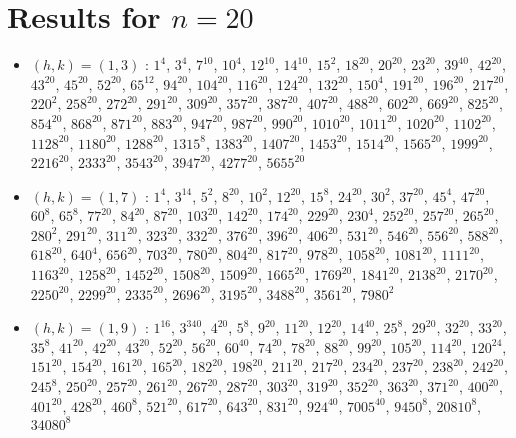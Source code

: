 \section{Results for $n=20$}
\begin{itemize}
\item $(h,k)=(1,3)$ : $1^{4}$, $3^{4}$, $7^{10}$, $10^{4}$, $12^{10}$, $14^{10}$, $15^{2}$, $18^{20}$, $20^{20}$, $23^{20}$, $39^{40}$, $42^{20}$, $43^{20}$, $45^{20}$, $52^{20}$, $65^{12}$, $94^{20}$, $104^{20}$, $116^{20}$, $124^{20}$, $132^{20}$, $150^{4}$, $191^{20}$, $196^{20}$, $217^{20}$, $220^{2}$, $258^{20}$, $272^{20}$, $291^{20}$, $309^{20}$, $357^{20}$, $387^{20}$, $407^{20}$, $488^{20}$, $602^{20}$, $669^{20}$, $825^{20}$, $854^{20}$, $868^{20}$, $871^{20}$, $883^{20}$, $947^{20}$, $987^{20}$, $990^{20}$, $1010^{20}$, $1011^{20}$, $1020^{20}$, $1102^{20}$, $1128^{20}$, $1180^{20}$, $1288^{20}$, $1315^{8}$, $1383^{20}$, $1407^{20}$, $1453^{20}$, $1514^{20}$, $1565^{20}$, $1999^{20}$, $2216^{20}$, $2333^{20}$, $3543^{20}$, $3947^{20}$, $4277^{20}$, $5655^{20}$
\item $(h,k)=(1,7)$ : $1^{4}$, $3^{14}$, $5^{2}$, $8^{20}$, $10^{2}$, $12^{20}$, $15^{8}$, $24^{20}$, $30^{2}$, $37^{20}$, $45^{4}$, $47^{20}$, $60^{8}$, $65^{8}$, $77^{20}$, $84^{20}$, $87^{20}$, $103^{20}$, $142^{20}$, $174^{20}$, $229^{20}$, $230^{4}$, $252^{20}$, $257^{20}$, $265^{20}$, $280^{2}$, $291^{20}$, $311^{20}$, $323^{20}$, $332^{20}$, $376^{20}$, $396^{20}$, $406^{20}$, $531^{20}$, $546^{20}$, $556^{20}$, $588^{20}$, $618^{20}$, $640^{4}$, $656^{20}$, $703^{20}$, $780^{20}$, $804^{20}$, $817^{20}$, $978^{20}$, $1058^{20}$, $1081^{20}$, $1111^{20}$, $1163^{20}$, $1258^{20}$, $1452^{20}$, $1508^{20}$, $1509^{20}$, $1665^{20}$, $1769^{20}$, $1841^{20}$, $2138^{20}$, $2170^{20}$, $2250^{20}$, $2299^{20}$, $2335^{20}$, $2696^{20}$, $3195^{20}$, $3488^{20}$, $3561^{20}$, $7980^{2}$
\item $(h,k)=(1,9)$ : $1^{16}$, $3^{340}$, $4^{20}$, $5^{8}$, $9^{20}$, $11^{20}$, $12^{20}$, $14^{40}$, $25^{8}$, $29^{20}$, $32^{20}$, $33^{20}$, $35^{8}$, $41^{20}$, $42^{20}$, $43^{20}$, $52^{20}$, $56^{20}$, $60^{40}$, $74^{20}$, $78^{20}$, $88^{20}$, $99^{20}$, $105^{20}$, $114^{20}$, $120^{24}$, $151^{20}$, $154^{20}$, $161^{20}$, $165^{20}$, $182^{20}$, $198^{20}$, $211^{20}$, $217^{20}$, $234^{20}$, $237^{20}$, $238^{20}$, $242^{20}$, $245^{8}$, $250^{20}$, $257^{20}$, $261^{20}$, $267^{20}$, $287^{20}$, $303^{20}$, $319^{20}$, $352^{20}$, $363^{20}$, $371^{20}$, $400^{20}$, $401^{20}$, $428^{20}$, $460^{8}$, $521^{20}$, $617^{20}$, $643^{20}$, $831^{20}$, $924^{40}$, $7005^{40}$, $9450^{8}$, $20810^{8}$, $34080^{8}$

\end{itemize}
